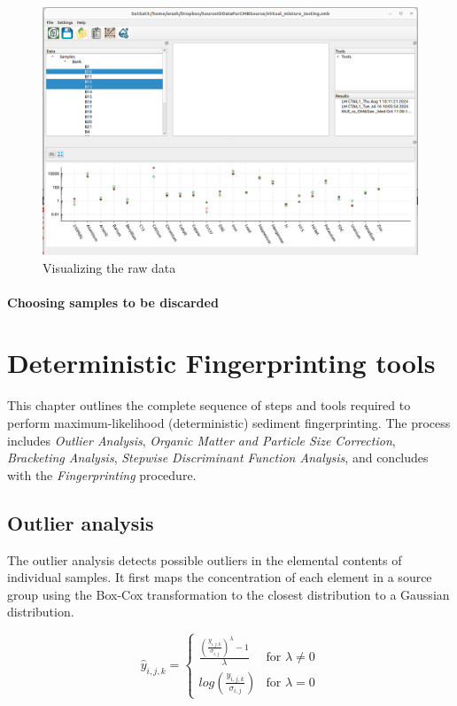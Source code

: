 \documentclass[12pt]{report}
\begin{document}
\begin{figure}[ht]
    \centering
    \includegraphics[width=14cm]{Figures/Constituent_Viz.png}
    \caption{Visualizing the raw data}
    \label{fig:constituents_vis}
\end{figure}

\subsubsection{Choosing samples to be discarded}



\chapter{Deterministic Fingerprinting tools}
This chapter outlines the complete sequence of steps and tools required to perform maximum-likelihood (deterministic) sediment fingerprinting. The process includes \textit{Outlier Analysis}, \textit{Organic Matter and Particle Size Correction}, \textit{Bracketing Analysis}, \textit{Stepwise Discriminant Function Analysis}, and concludes with the \textit{Fingerprinting} procedure.


\section{Outlier analysis}
The outlier analysis detects possible outliers in the elemental contents of individual samples. It first maps the concentration of each element in a source group using the Box-Cox transformation to the closest distribution to a Gaussian distribution. 

\begin{equation}
     \hat{y}_{i,j,k} = \begin{cases}
   \frac{\left(\frac{y_{i,j,k}}{\sigma_{i,j}}\right)^\lambda-1}{\lambda} & \text{for }\lambda \neq 0\\    
   log\left(\frac{y_{i,j,k}}{\sigma_{i,j}}\right) & \text{for } \lambda=0    
\end{cases}
\end{equation}
\end{document}
